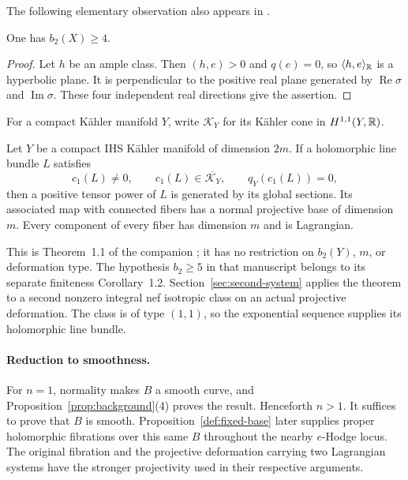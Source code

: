 The following elementary observation also appears in
\cite[Lemma~3.1]{GrebLehn2014}.

\begin{lemma}\label{lem:betti-bound}
One has $b_2(X)\geq4$.
\end{lemma}
\begin{proof}
Let $h$ be an ample class. Then $(h,e)>0$ and $q(e)=0$, so
$\langle h,e\rangle_{\mathbb R}$ is a hyperbolic plane.
It is perpendicular to the positive real plane generated by
$\operatorname{Re}\sigma$ and $\operatorname{Im}\sigma$.
These four independent real directions give the assertion.
\end{proof}

For a compact Kähler manifold $Y$, write $\mathcal K_Y$ for its
Kähler cone in $H^{1,1}(Y,\mathbb R)$.

\begin{theorem}
\label{thm:strong-syz}
Let $Y$ be a compact IHS Kähler manifold of dimension $2m$.
If a holomorphic line bundle $L$ satisfies
\[
 c_1(L)\neq0,\qquad
 c_1(L)\in\overline{\mathcal K_Y},\qquad
 q_Y(c_1(L))=0,
\]
then a positive tensor power of $L$ is generated by its global
sections. Its associated map with connected fibers has a normal
projective base of dimension $m$. Every component of every fiber
has dimension $m$ and is Lagrangian.
\end{theorem}

This is Theorem~1.1 of the companion \cite{StrongSYZ2026}; it has no
restriction on \(b_2(Y)\), \(m\), or deformation type. The hypothesis
\(b_2\geq5\) in that manuscript belongs to its separate finiteness
Corollary~1.2. Section~\ref{sec:second-system} applies the theorem to a
second nonzero integral nef isotropic class on an actual projective
deformation. The class is of type \((1,1)\), so the exponential sequence
supplies its holomorphic line bundle.

\paragraph{Reduction to smoothness.}
For $n=1$, normality makes $B$ a smooth curve, and
Proposition~\ref{prop:background}(4) proves the result.
Henceforth $n>1$. It suffices to prove that $B$ is smooth.
Proposition~\ref{def:fixed-base} later supplies proper holomorphic
fibrations over this same \(B\) throughout the nearby \(e\)-Hodge locus.
The original fibration and the projective deformation carrying two
Lagrangian systems have the stronger projectivity used in their respective
arguments.

